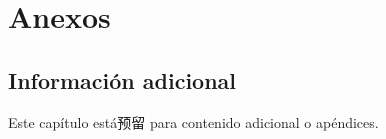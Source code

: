 
\chapter{Anexos}

\section{Información adicional}

Este capítulo está预留 para contenido adicional o apéndices.

